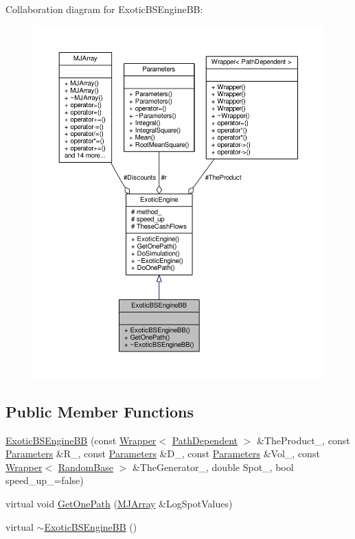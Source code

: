 Collaboration diagram for Exotic\+B\+S\+Engine\+BB\+:
\nopagebreak
\begin{figure}[H]
\begin{center}
\leavevmode
\includegraphics[width=350pt]{classExoticBSEngineBB__coll__graph}
\end{center}
\end{figure}
\subsection*{Public Member Functions}
\begin{DoxyCompactItemize}
\item 
\hyperlink{classExoticBSEngineBB_af8f524ef061a0ff7fda07a90ace2c794}{Exotic\+B\+S\+Engine\+BB} (const \hyperlink{classWrapper}{Wrapper}$<$ \hyperlink{classPathDependent}{Path\+Dependent} $>$ \&The\+Product\+\_\+, const \hyperlink{classParameters}{Parameters} \&R\+\_\+, const \hyperlink{classParameters}{Parameters} \&D\+\_\+, const \hyperlink{classParameters}{Parameters} \&Vol\+\_\+, const \hyperlink{classWrapper}{Wrapper}$<$ \hyperlink{classRandomBase}{Random\+Base} $>$ \&The\+Generator\+\_\+, double Spot\+\_\+, bool speed\+\_\+up\+\_\+=false)
\item 
virtual void \hyperlink{classExoticBSEngineBB_ad11cfbdc7c2096d8493e0de6eb1eec4b}{Get\+One\+Path} (\hyperlink{classMJArray}{M\+J\+Array} \&Log\+Spot\+Values)
\item 
virtual \hyperlink{classExoticBSEngineBB_ab0cec2f243a827428ae1546b42acd57d}{$\sim$\+Exotic\+B\+S\+Engine\+BB} ()
\end{DoxyCompactItemize}
